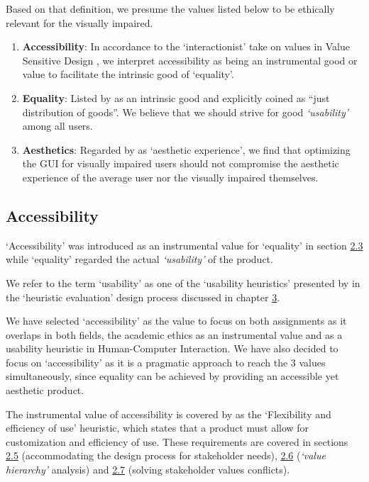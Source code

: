 \documentclass{article}
\begin{document}
Based on that definition, we presume the values listed below to be ethically relevant for the visually impaired.

\begin{enumerate}
    \item \textbf{Accessibility}: In accordance to the `interactionist' take on values in Value Sensitive Design \parencite{Friedman2013},
    we interpret accessibility as being an instrumental good or value to facilitate the intrinsic good of `equality'.
    \item \textbf{Equality}: Listed by \textcite{Frankena1973} as an intrinsic good and explicitly coined as ``just distribution of goods''.
    We believe that we should strive for good \emph{`usability'} \parencite{Nielsen1994} among all users.
    \item \textbf{Aesthetics}: Regarded by \textcite{Frankena1973} as `aesthetic experience', we find that optimizing the GUI for
    visually impaired users should not compromise the aesthetic experience of the average user nor the visually impaired themselves.
\end{enumerate}

\subsection{Accessibility\label{accessibility}}

`Accessibility' was introduced as an instrumental value for `equality' in section \hyperref[valuesMinority]{2.3} while `equality' regarded
the actual \emph{`usability'} of the product.

We refer to the term `usability' as one of the `usability heuristics' presented by \textcite{Nielsen1994} in the
`heuristic evaluation' design process discussed in chapter \hyperref[hci]{3}.

We have selected `accessibility' as the value to focus on both assignments as it overlaps in both fields, the academic ethics as
an instrumental value \parencite{Zimmerman2019} and as a usability heuristic \parencite{Nielsen1994} in Human-Computer Interaction.
We have also decided to focus on `accessibility' as it is a pragmatic approach to reach the 3 values simultaneously, since equality can
be achieved by providing an accessible yet aesthetic product.

The instrumental value of accessibility is covered by \textcite{Nielsen1994} as the `Flexibility and efficiency of use' heuristic,
which states that a product must allow for customization and efficiency of use. These requirements are covered in sections
\hyperref[stakeholderSupport]{2.5} (accommodating the design process for stakeholder needs), \hyperref[valueHierarchy]{2.6} (\emph{`value hierarchy'} analysis)
and \hyperref[stakeholderConflict]{2.7} (solving stakeholder values conflicts).
\end{document}
